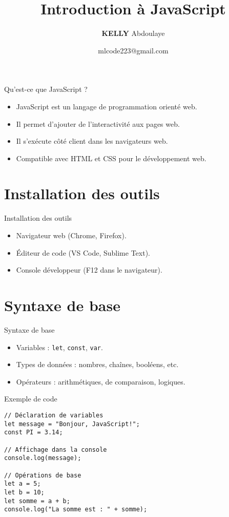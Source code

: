 \documentclass{beamer}
\title{Introduction à JavaScript}
\author{\textbf{KELLY}  Abdoulaye}
\institute{\textit{Mali\_Code}}
\date{mlcode223@gmail.com}
\begin{document}
\frame{\titlepage}

\begin{frame}{Qu'est-ce que JavaScript ?}
\begin{itemize}
    \item JavaScript est un langage de programmation orienté web.
    \item Il permet d'ajouter de l'interactivité aux pages web.
    \item Il s'exécute côté client dans les navigateurs web.
    \item Compatible avec HTML et CSS pour le développement web.
\end{itemize}
\end{frame}

\section{Installation des outils}
\begin{frame}{Installation des outils}
\begin{itemize}
    \item Navigateur web (Chrome, Firefox).
    \item Éditeur de code (VS Code, Sublime Text).
    \item Console développeur (F12 dans le navigateur).
\end{itemize}
\end{frame}

\section{Syntaxe de base}
\begin{frame}{Syntaxe de base}
\begin{itemize}
    \item Variables : \texttt{let}, \texttt{const}, \texttt{var}.
    \item Types de données : nombres, chaînes, booléens, etc.
    \item Opérateurs : arithmétiques, de comparaison, logiques.
\end{itemize}
\end{frame}

\begin{frame}[fragile]{Exemple de code}
\begin{verbatim}
// Déclaration de variables
let message = "Bonjour, JavaScript!";
const PI = 3.14;

// Affichage dans la console
console.log(message);

// Opérations de base
let a = 5;
let b = 10;
let somme = a + b;
console.log("La somme est : " + somme);
\end{verbatim}
\end{frame}
\end{document}
